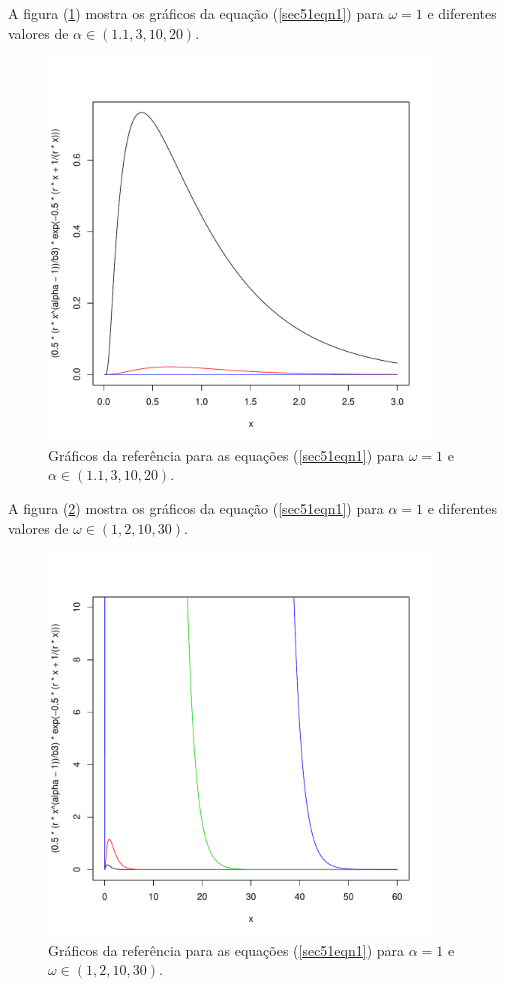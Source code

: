 \documentclass[12pt,a4paper]{article}
\begin{document}
A figura (\ref{sec51fig2}) mostra os gráficos da equação (\ref{sec51eqn1}) para $\omega=1$ e diferentes valores de $\alpha\in(1.1,3,10,20)$. 

\begin{figure}[!htb]
\centering
\includegraphics[width=4.0in]{fig1_freitas_frery_2005.pdf}
	\caption{Gráficos da referência \cite{freitas_frery_2005} para as equações (\ref{sec51eqn1}) para $\omega=1$ e $\alpha\in(1.1,3,10,20)$.}
\label{sec51fig2}
\end{figure}

A figura (\ref{sec51fig3}) mostra os gráficos da equação (\ref{sec51eqn1}) para $\alpha=1$ e diferentes valores de $\omega\in(1,2,10,30)$. 

\begin{figure}[!htb]
\centering
\includegraphics[width=4.0in]{fig2_freitas_frery_2005.pdf}
	\caption{Gráficos da referência \cite{freitas_frery_2005} para as equações (\ref{sec51eqn1}) para $\alpha=1$ e $\omega\in(1,2,10,30)$.}
\label{sec51fig3}
\end{figure}
\end{document}
